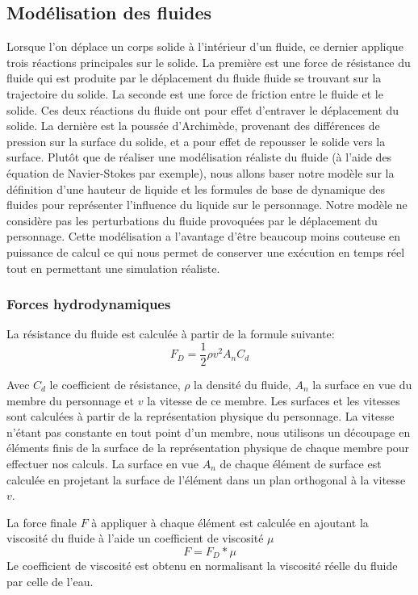 \documentclass[runningheads,a4paper]{llncs}
\begin{document}
\subsection{Modélisation des fluides}
%
Lorsque l'on déplace un corps solide à l'intérieur d'un fluide, ce dernier applique trois réactions principales sur le solide. La première est une force de résistance du fluide qui est produite par le déplacement du fluide fluide se trouvant sur la trajectoire du solide. La seconde est une force de friction entre le fluide et le solide. Ces deux réactions du fluide ont pour effet d'entraver le déplacement du solide. La dernière est la poussée d'Archimède, provenant des différences de pression sur la surface du solide, et a pour effet de repousser le solide vers la surface.
Plutôt que de réaliser une modélisation réaliste du fluide (à l'aide des équation de Navier-Stokes par exemple), nous allons baser notre modèle sur la définition d'une hauteur de liquide et les formules de base de dynamique des fluides pour représenter l'influence du liquide sur le personnage. Notre modèle ne considère pas les perturbations du fluide provoquées par le déplacement du personnage. Cette modélisation a l'avantage d'être beaucoup moins couteuse en puissance de calcul ce qui nous permet de conserver une exécution en temps réel tout en permettant une simulation réaliste.
%
\subsubsection{Forces hydrodynamiques}
%
La résistance du fluide est calculée à partir de la formule suivante:
\[
F_D=\frac{1}{2} \rho v^2 A_n C_d
\]


Avec \(C_d\) le coefficient de résistance, \(\rho\) la densité du fluide, \(A_n\) la surface en vue du membre du personnage et \(v\) la vitesse de ce membre. Les surfaces et les vitesses sont calculées à partir de la représentation physique du personnage. La vitesse n'étant pas constante en tout point d'un membre, nous utilisons un découpage en éléments finis de la surface de la représentation physique de chaque membre pour effectuer nos calculs. La surface en vue $A_n$ de chaque élément de surface est calculée en projetant la surface de l'élément dans un plan orthogonal à la vitesse $v$. 

La force finale $F$ à appliquer à chaque élément est calculée en ajoutant la viscosité du fluide à l'aide un coefficient de viscosité $\mu$ 
\[
F=F_D*\mu
\]
Le coefficient de viscosité est obtenu en normalisant la viscosité réelle du fluide par celle de l'eau.
%
\end{document}
